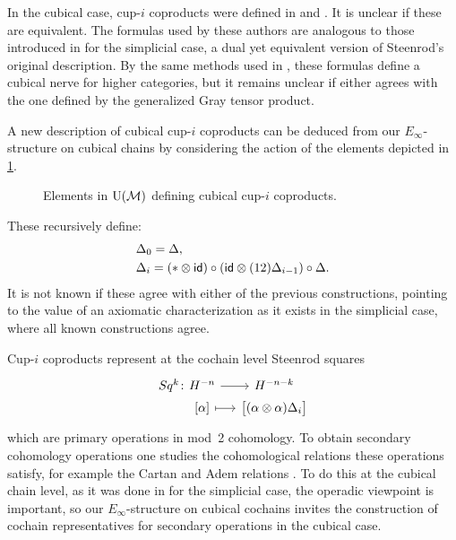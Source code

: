 In the cubical case, cup-$i$ coproducts were defined in \cite{kadeishvili1999coproducts} and \cite{pilarczyk2016cubical}.
It is unclear if these are equivalent.
The formulas used by these authors are analogous to those introduced in \cite{medina2021fast_sq} for the simplicial case, a dual yet equivalent version of Steenrod's original description.
By the same methods used in \cite{medina2020globular}, these formulas define a cubical nerve for higher categories, but it remains unclear if either agrees with the one defined by the generalized Gray tensor product.

A new description of cubical cup-$i$ coproducts can be deduced from our $E_\infty$-structure on cubical chains by considering the action of the elements depicted in \cref{f:cup-i}.
\begin{figure}
	\centering
	
	\caption{Elements in ${\operatorname{U}(\mathcal{M})}$ defining cubical cup-$i$ coproducts.}
	\label{f:cup-i}
\end{figure}
These recursively define:
\begin{equation} \label{e:prop cup-i}
	\begin{split}
		& \Delta_0 = \Delta, \\
		& \Delta_i =
		(\ast \otimes \mathsf{id}) \circ (\mathsf{id} \otimes (12) \Delta_{i-1}) \circ \Delta.
	\end{split}
\end{equation}
It is not known if these agree with either of the previous constructions, pointing to the value of an axiomatic characterization as it exists in the simplicial case, where all known constructions agree.

Cup-$i$ coproducts represent at the cochain level Steenrod squares
\[
\begin{tikzcd} [column sep=small, row sep=0]
	Sq^k \colon &[-20] H^{-n} \arrow[r] & H^{-n-k} \\ &
	{[\alpha]} \arrow[r, mapsto] & \big[ (\alpha \ot \alpha) \Delta_i \big]
\end{tikzcd}
\]
which are primary operations in mod~2 cohomology.
To obtain secondary cohomology operations one studies the cohomological relations these operations satisfy, for example the Cartan and Adem relations \cite{steenrod1962cohomology}.
To do this at the cubical chain level, as it was done in \cite{medina2020cartan,medina2021adem} for the simplicial case, the operadic viewpoint is important, so our $E_\infty$-structure on cubical cochains invites the construction of cochain representatives for secondary operations in the cubical case.

